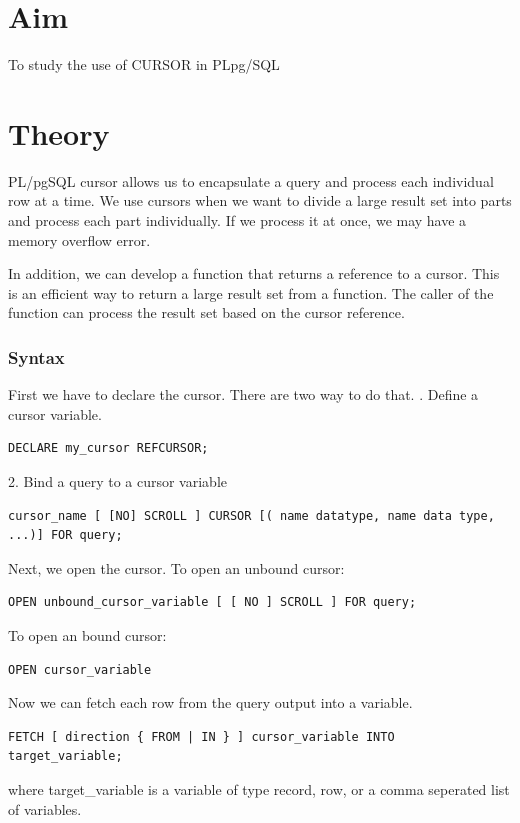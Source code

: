 \section{Aim}
 To study the use of CURSOR in PLpg/SQL

\section{{Theory}}

PL/pgSQL cursor allows us to encapsulate a query and process each individual row at a time. We use cursors when we want to divide a large result set into parts and process each part individually. If we process it at once, we may have a memory overflow error.

In addition, we can develop a function that returns a reference to a cursor. This is an efficient way to return a large result set from a function. The caller of the function can process the result set based on the cursor reference.

\subsubsection{Syntax}

First we have to declare the cursor. There are two way to do that. 
. Define a cursor variable. 
\begin{verbatim}
DECLARE my_cursor REFCURSOR;
\end{verbatim}
2. Bind a query to a cursor variable
\begin{verbatim}
cursor_name [ [NO] SCROLL ] CURSOR [( name datatype, name data type, ...)] FOR query;
\end{verbatim}
Next, we open the cursor.\newline
To open an unbound cursor:
\begin{verbatim}
OPEN unbound_cursor_variable [ [ NO ] SCROLL ] FOR query;
\end{verbatim}
\newline
To open an bound cursor:
\begin{verbatim}
OPEN cursor_variable
\end{verbatim}
Now we can fetch each row from the query output into a variable. 
\begin{verbatim}
FETCH [ direction { FROM | IN } ] cursor_variable INTO target_variable;
\end{verbatim}
where target\_variable is a variable of type record, row, or a comma seperated list of variables.

